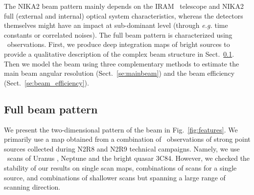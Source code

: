 
The NIKA2 beam pattern mainly depends on the IRAM \trentemetre\ telescope and
NIKA2 full (external and internal) optical system characteristics,
whereas the detectors themselves might have an impact at sub-dominant
level (through \emph{e.g.} time constants or correlated noises).
The full beam pattern is characterized using \bm\ observations. First,
we produce deep integration maps of bright sources to provide a
qualitative description of the complex beam structure in
Sect.~\ref{se:fullbeam}. Then we model the beam using three
complementary methods to estimate the main beam angular resolution
(Sect.~\ref{se:mainbeam}) and the beam efficiency
(Sect.~\ref{se:beam_efficiency}).

\subsection{Full beam pattern}
\label{se:fullbeam}

We present the two-dimensional pattern of the beam in
Fig.~\ref{fig:features}. We primarily use a map obtained from a combination
of \bm\ observations of strong point sources collected during
N2R8 and N2R9 technical campaigns. Namely, we use \bm\ scans
of Uranus%
,  Neptune %
and the bright quasar 3C84. %
However, we checked the stability of our results on single scan maps,
combinations of scans for a single source, and combinations of
shallower scans but spanning a large range of scanning direction.


